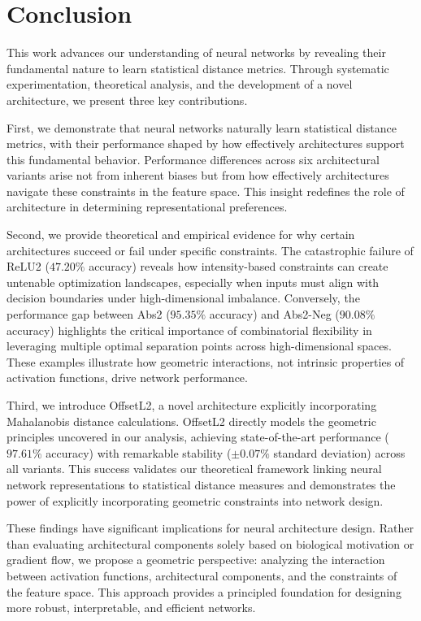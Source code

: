 \section{Conclusion}

This work advances our understanding of neural networks by revealing their fundamental nature to learn statistical distance metrics. Through systematic experimentation, theoretical analysis, and the development of a novel architecture, we present three key contributions.

First, we demonstrate that neural networks naturally learn statistical distance metrics, with their performance shaped by how effectively architectures support this fundamental behavior. Performance differences across six architectural variants arise not from inherent biases but from how effectively architectures navigate these constraints in the feature space. This insight redefines the role of architecture in determining representational preferences.

Second, we provide theoretical and empirical evidence for why certain architectures succeed or fail under specific constraints. The catastrophic failure of ReLU2 ($47.20\%$ accuracy) reveals how intensity-based constraints can create untenable optimization landscapes, especially when inputs must align with decision boundaries under high-dimensional imbalance. Conversely, the performance gap between Abs2 ($95.35\%$ accuracy) and Abs2-Neg ($90.08\%$ accuracy) highlights the critical importance of combinatorial flexibility in leveraging multiple optimal separation points across high-dimensional spaces. These examples illustrate how geometric interactions, not intrinsic properties of activation functions, drive network performance.

Third, we introduce OffsetL2, a novel architecture explicitly incorporating Mahalanobis distance calculations. OffsetL2 directly models the geometric principles uncovered in our analysis, achieving state-of-the-art performance ($97.61\%$ accuracy) with remarkable stability ($\pm0.07\%$ standard deviation) across all variants. This success validates our theoretical framework linking neural network representations to statistical distance measures and demonstrates the power of explicitly incorporating geometric constraints into network design.

These findings have significant implications for neural architecture design. Rather than evaluating architectural components solely based on biological motivation or gradient flow, we propose a geometric perspective: analyzing the interaction between activation functions, architectural components, and the constraints of the feature space. This approach provides a principled foundation for designing more robust, interpretable, and efficient networks. 

